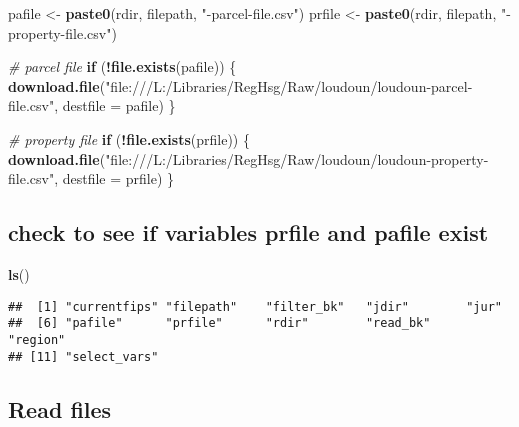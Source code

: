 \documentclass[]{article}
\newenvironment{Shaded}{\begin{snugshade}}{\end{snugshade}}
\newcommand{\KeywordTok}[1]{\textcolor[rgb]{0.13,0.29,0.53}{\textbf{#1}}}
\newcommand{\DataTypeTok}[1]{\textcolor[rgb]{0.13,0.29,0.53}{#1}}
\newcommand{\StringTok}[1]{\textcolor[rgb]{0.31,0.60,0.02}{#1}}
\newcommand{\CommentTok}[1]{\textcolor[rgb]{0.56,0.35,0.01}{\textit{#1}}}
\newcommand{\ControlFlowTok}[1]{\textcolor[rgb]{0.13,0.29,0.53}{\textbf{#1}}}
\newcommand{\OperatorTok}[1]{\textcolor[rgb]{0.81,0.36,0.00}{\textbf{#1}}}
\newcommand{\NormalTok}[1]{#1}
\begin{document}
\begin{Shaded}
\begin{Highlighting}[]
\NormalTok{pafile <-}\StringTok{ }\KeywordTok{paste0}\NormalTok{(rdir, filepath, }\StringTok{"-parcel-file.csv"}\NormalTok{)}
\NormalTok{prfile <-}\StringTok{ }\KeywordTok{paste0}\NormalTok{(rdir, filepath, }\StringTok{"-property-file.csv"}\NormalTok{)}

\CommentTok{# parcel file}
\ControlFlowTok{if}\NormalTok{ (}\OperatorTok{!}\KeywordTok{file.exists}\NormalTok{(pafile)) \{}
  \KeywordTok{download.file}\NormalTok{(}\StringTok{"file:///L:/Libraries/RegHsg/Raw/loudoun/loudoun-parcel-file.csv"}\NormalTok{,}
                \DataTypeTok{destfile =}\NormalTok{ pafile)}
\NormalTok{\}}

\CommentTok{# property file}
\ControlFlowTok{if}\NormalTok{ (}\OperatorTok{!}\KeywordTok{file.exists}\NormalTok{(prfile)) \{}
  \KeywordTok{download.file}\NormalTok{(}\StringTok{"file:///L:/Libraries/RegHsg/Raw/loudoun/loudoun-property-file.csv"}\NormalTok{,}
                \DataTypeTok{destfile =}\NormalTok{ prfile)}
\NormalTok{\}}
\end{Highlighting}
\end{Shaded}

\subsection{check to see if variables prfile and pafile
exist}\label{check-to-see-if-variables-prfile-and-pafile-exist}

\begin{Shaded}
\begin{Highlighting}[]
\KeywordTok{ls}\NormalTok{()}
\end{Highlighting}
\end{Shaded}

\begin{verbatim}
##  [1] "currentfips" "filepath"    "filter_bk"   "jdir"        "jur"        
##  [6] "pafile"      "prfile"      "rdir"        "read_bk"     "region"     
## [11] "select_vars"
\end{verbatim}

\subsection{Read files}\label{read-files}
\end{document}
